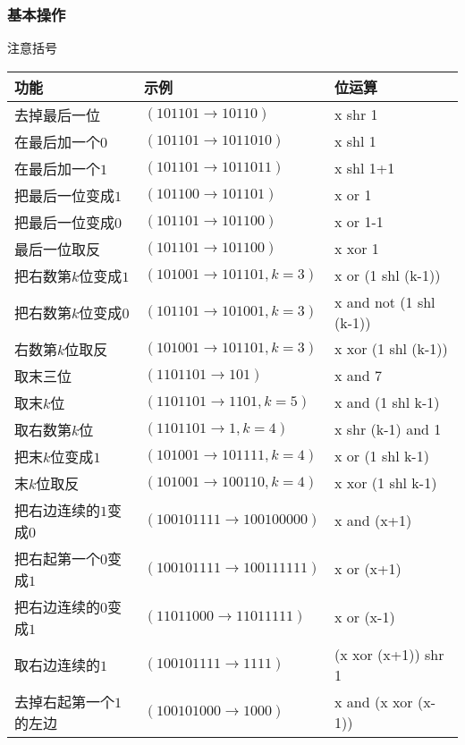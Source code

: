 	\subsubsection{基本操作}
	注意括号\\
		\begin{table}[htbp]
		\centering
		\begin{tabular}{l|l|l}
		\toprule
		功能 & 示例 & 位运算\\
		\midrule
		去掉最后一位		  & $(101101\rightarrow 10110)$		   & x shr 1\\
		在最后加一个$0$		 & $(101101\rightarrow1011010)$		 & x shl 1\\
		在最后加一个$1$		 & $(101101\rightarrow1011011)$		 & x shl 1+1\\
		把最后一位变成$1$	   & $(101100\rightarrow101101)$		  & x or 1\\
		把最后一位变成$0$	   & $(101101\rightarrow101100)$		  & x or 1-1\\
		最后一位取反		  & $(101101\rightarrow101100)$		  & x xor 1\\
		把右数第$k$位变成$1$	  & $(101001\rightarrow101101,k=3)$	  & x or (1 shl (k-1))\\
		把右数第$k$位变成$0$	  & $(101101\rightarrow101001,k=3)$	  & x and not (1 shl (k-1))\\
		右数第$k$位取反		 & $(101001\rightarrow101101,k=3)$	  & x xor (1 shl (k-1))\\
		取末三位			  & $(1101101\rightarrow101)$			& x and 7\\
		取末$k$位			   & $(1101101\rightarrow1101,k=5)$	   & x and (1 shl k-1)\\
		取右数第$k$位		   & $(1101101\rightarrow1,k=4)$		  & x shr (k-1) and 1\\
		把末$k$位变成$1$		  & $(101001\rightarrow101111,k=4)$	  & x or (1 shl k-1)\\
		末$k$位取反			 & $(101001\rightarrow100110,k=4)$	  & x xor (1 shl k-1)\\
		把右边连续的$1$变成$0$	& $(100101111\rightarrow100100000)$	& x and (x+1)\\
		把右起第一个$0$变成$1$	& $(100101111\rightarrow100111111)$	& x or (x+1)\\
		把右边连续的$0$变成$1$	& $(11011000\rightarrow11011111)$	  & x or (x-1)\\
		取右边连续的$1$		 & $(100101111\rightarrow1111)$		 & (x xor (x+1)) shr 1\\
		去掉右起第一个$1$的左边 & $(100101000\rightarrow1000)$		 & x and (x xor (x-1))\\
		\bottomrule
		\end{tabular}
	\end{table}
	

